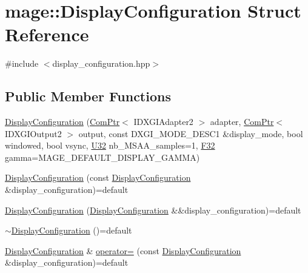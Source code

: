 \hypertarget{structmage_1_1_display_configuration}{}\section{mage\+:\+:Display\+Configuration Struct Reference}
\label{structmage_1_1_display_configuration}


{\ttfamily \#include $<$display\+\_\+configuration.\+hpp$>$}

\subsection*{Public Member Functions}
\begin{DoxyCompactItemize}
\item 
\hyperlink{structmage_1_1_display_configuration_ad65b12ae3b6f5acaa7ed78df9ad3e2b7}{Display\+Configuration} (\hyperlink{namespacemage_ae74f374780900893caa5555d1031fd79}{Com\+Ptr}$<$ I\+D\+X\+G\+I\+Adapter2 $>$ adapter, \hyperlink{namespacemage_ae74f374780900893caa5555d1031fd79}{Com\+Ptr}$<$ I\+D\+X\+G\+I\+Output2 $>$ output, const D\+X\+G\+I\+\_\+\+M\+O\+D\+E\+\_\+\+D\+E\+S\+C1 \&display\+\_\+mode, bool windowed, bool vsync, \hyperlink{namespacemage_a41c104c036fba3756a74e19f793eeaa1}{U32} nb\+\_\+\+M\+S\+A\+A\+\_\+samples=1, \hyperlink{namespacemage_aa97e833b45f06d60a0a9c4fc22ae02c0}{F32} gamma=M\+A\+G\+E\+\_\+\+D\+E\+F\+A\+U\+L\+T\+\_\+\+D\+I\+S\+P\+L\+A\+Y\+\_\+\+G\+A\+M\+MA)
\item 
\hyperlink{structmage_1_1_display_configuration_a1b99f5eb69a7ec1e525d551a8004f508}{Display\+Configuration} (const \hyperlink{structmage_1_1_display_configuration}{Display\+Configuration} \&display\+\_\+configuration)=default
\item 
\hyperlink{structmage_1_1_display_configuration_a5adbfbaf7de92292af56b2b56f76d548}{Display\+Configuration} (\hyperlink{structmage_1_1_display_configuration}{Display\+Configuration} \&\&display\+\_\+configuration)=default
\item 
\hyperlink{structmage_1_1_display_configuration_a91cdf4f2015177e41290238d96a55328}{$\sim$\+Display\+Configuration} ()=default
\item 
\hyperlink{structmage_1_1_display_configuration}{Display\+Configuration} \& \hyperlink{structmage_1_1_display_configuration_a43d4997e418b27add46442e88ba3672b}{operator=} (const \hyperlink{structmage_1_1_display_configuration}{Display\+Configuration} \&display\+\_\+configuration)=default
\item 

\end{DoxyCompactItemize}
